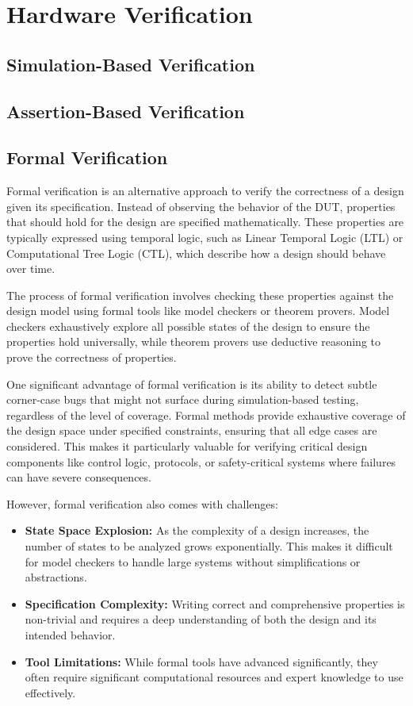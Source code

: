 \documentclass[12pt]{book}
\begin{document}
\section{Hardware Verification}

\subsection{Simulation-Based Verification}

\subsection{Assertion-Based Verification}

\subsection{Formal Verification}

Formal verification is an alternative approach to verify the correctness of a design given its specification. Instead of observing the behavior of the DUT, properties that should hold for the design are specified mathematically. These properties are typically expressed using temporal logic, such as Linear Temporal Logic (LTL) or Computational Tree Logic (CTL), which describe how a design should behave over time.

The process of formal verification involves checking these properties against the design model using formal tools like model checkers or theorem provers. Model checkers exhaustively explore all possible states of the design to ensure the properties hold universally, while theorem provers use deductive reasoning to prove the correctness of properties.

One significant advantage of formal verification is its ability to detect subtle corner-case bugs that might not surface during simulation-based testing, regardless of the level of coverage. Formal methods provide exhaustive coverage of the design space under specified constraints, ensuring that all edge cases are considered. This makes it particularly valuable for verifying critical design components like control logic, protocols, or safety-critical systems where failures can have severe consequences.

However, formal verification also comes with challenges:
\begin{itemize}
    \item \textbf{State Space Explosion:} As the complexity of a design increases, the number of states to be analyzed grows exponentially. This makes it difficult for model checkers to handle large systems without simplifications or abstractions.
    \item \textbf{Specification Complexity:} Writing correct and comprehensive properties is non-trivial and requires a deep understanding of both the design and its intended behavior.
    \item \textbf{Tool Limitations:} While formal tools have advanced significantly, they often require significant computational resources and expert knowledge to use effectively.
\end{itemize}
\end{document}
